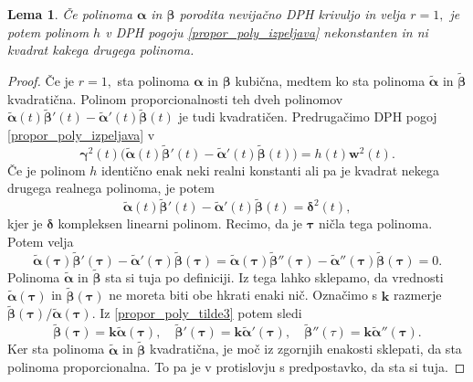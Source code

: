 \documentclass[12pt,a4paper,twoside]{article}
\theoremstyle{definition} %
\theoremstyle{plain} %
\newtheorem{lema}[definicija]{Lema}
\theoremstyle{primerstyle}
\numberwithin{equation}{section}  %
\newcommand{\kV}{\mathbf{k}}
\newcommand{\wV}{\mathbf{w}}
\newcommand{\balpha}{\boldsymbol \alpha}
\newcommand{\bbeta}{\boldsymbol \beta}
\newcommand{\bgamma}{\boldsymbol \gamma}
\newcommand{\bdelta}{\boldsymbol \delta}
\newcommand{\btau}{\boldsymbol \tau}
\newcommand{\btalpha}{\tilde{\boldsymbol \alpha}}
\newcommand{\btbeta}{\tilde{\boldsymbol \beta}}
\begin{document}
\begin{lema}
	\label{lema_2}
	Če polinoma $\balpha$ in $\bbeta$ porodita nevijačno DPH krivuljo in velja $r=1,$ je potem polinom $h$ v DPH pogoju \eqref{propor_poly_izpeljava} nekonstanten in ni kvadrat kakega drugega polinoma.
\end{lema}
\begin{proof}
	Če je $r=1,$ sta polinoma $\balpha$ in $\bbeta$ kubična, medtem ko sta polinoma $\btalpha$ in $\btbeta$ kvadratična. Polinom proporcionalnosti teh dveh polinomov $\btalpha(t)\btbeta'(t)-\btalpha'(t)\btbeta(t)$ je tudi kvadratičen. Predrugačimo DPH pogoj \eqref{propor_poly_izpeljava} v
	\begin{equation}
		\label{propor_poly_tilde}
		\bgamma^2(t)\big(\btalpha(t)\btbeta'(t)-\btalpha'(t)\btbeta(t)\big)=h(t)\wV^2(t).
	\end{equation}
	Če je polinom $h$ identično enak neki realni konstanti ali pa je kvadrat nekega drugega realnega polinoma, je potem
	\begin{equation}
		\label{propor_poly_tilde2}
		\btalpha(t)\btbeta'(t)-\btalpha'(t)\btbeta(t)=\bdelta^2(t),
	\end{equation}
	kjer je $\bdelta$ kompleksen linearni polinom. Recimo, da je $\btau$ ničla tega polinoma. Potem velja
	\begin{equation}
		\label{propor_poly_tilde3}
		\btalpha(\btau)\btbeta'(\btau)-\btalpha'(\btau)\btbeta(\btau)=\btalpha(\btau)\btbeta''(\btau)-\btalpha''(\btau)\btbeta(\btau)=0.
	\end{equation}
	Polinoma $\btalpha$ in $\btbeta$ sta si tuja po definiciji. Iz tega lahko sklepamo, da vrednosti $\btalpha(\btau)$ in $\btbeta(\btau)$ ne moreta biti obe hkrati enaki nič. Označimo s $\kV$ razmerje $\btbeta(\btau)/\btalpha(\btau).$ Iz \eqref{propor_poly_tilde3} potem sledi
	\begin{equation}
		\btbeta(\btau)=\kV\btalpha(\btau),\quad\btbeta'(\btau)=\kV\btalpha'(\btau),\quad\btbeta''(\tau)=\kV\btalpha''(\btau).
	\end{equation}
	Ker sta polinoma $\btalpha$ in $\btbeta$ kvadratična, je moč iz zgornjih enakosti sklepati, da sta polinoma proporcionalna. To pa je v protislovju s predpostavko, da sta si tuja.
	

\end{proof}
\end{document}
